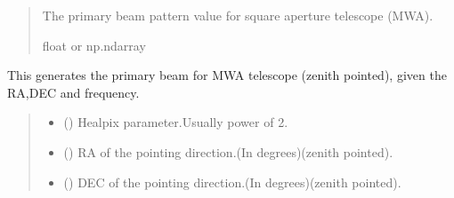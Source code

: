 \documentclass[a4paper,11pt,oneside,english,openany]{sphinxmanual}
\begin{document}
\begin{fulllineitems}
\begin{quote}
\begin{description}
\begin{itemize}
\end{itemize}

\sphinxAtStartPar
The primary beam pattern value for square aperture telescope (MWA).

\sphinxAtStartPar
float or np.ndarray

\end{description}\end{quote}

\clearpage

\end{fulllineitems}


\begin{fulllineitems}
\label{\detokenize{simvis:simvis.pbgen}}
\pysigstartsignatures
{}
\pysigstopsignatures
\sphinxAtStartPar
This generates the primary beam for MWA telescope (zenith pointed), given the RA,DEC and frequency.
\begin{quote}\begin{description}
\begin{itemize}
\item {} 
\sphinxAtStartPar
{} () \textendash{} Healpix parameter.Usually power of 2.

\item {} 
\sphinxAtStartPar
{} () \textendash{} RA of the pointing direction.(In degrees)(zenith pointed).

\item {} 
\sphinxAtStartPar
{} () \textendash{} DEC of the pointing direction.(In degrees)(zenith pointed).


\end{itemize}
\end{description}
\end{quote}
\end{fulllineitems}
\end{document}
